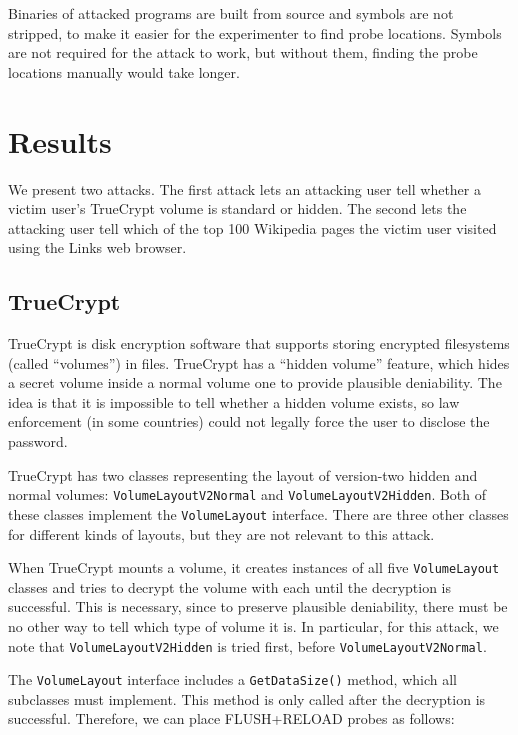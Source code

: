 \documentclass{acm_proc_article-sp}
\begin{document}
Binaries of attacked programs are built from source and symbols are not
stripped, to make it easier for the experimenter to find probe locations.
Symbols are not required for the attack to work, but without them, finding the
probe locations manually would take longer.

\section{Results}
\label{sec:results}

We present two attacks. The first attack lets an attacking user tell whether
a victim user's TrueCrypt volume is standard or hidden. The second lets the
attacking user tell which of the top 100 Wikipedia pages the victim user visited
using the Links web browser.

\subsection{TrueCrypt}

TrueCrypt is disk encryption software that supports storing encrypted
filesystems (called ``volumes'') in files. TrueCrypt has a ``hidden volume''
feature, which hides a secret volume inside a normal volume one to provide
plausible deniability. The idea is that it is impossible to tell whether
a hidden volume exists, so law enforcement (in some countries) could not legally
force the user to disclose the password.

TrueCrypt has two classes representing the layout of version-two hidden and
normal volumes: \texttt{VolumeLayoutV2Normal} and \texttt{VolumeLayoutV2Hidden}.
Both of these classes implement the \texttt{VolumeLayout} interface. There are
three other classes for different kinds of layouts, but they are not relevant to
this attack. 

When TrueCrypt mounts a volume, it creates instances of all five
\texttt{VolumeLayout} classes and tries to decrypt the volume with each until
the decryption is successful. This is necessary, since to preserve plausible
deniability, there must be no other way to tell which type of volume it is. In
particular, for this attack, we note that \texttt{VolumeLayoutV2Hidden} is tried
first, before \texttt{VolumeLayoutV2Normal}.

The \texttt{VolumeLayout} interface includes a \texttt{GetDataSize()} method,
which all subclasses must implement. This method is only called after the
decryption is successful. Therefore, we can place FLUSH+RELOAD probes as
follows:
\end{document}
